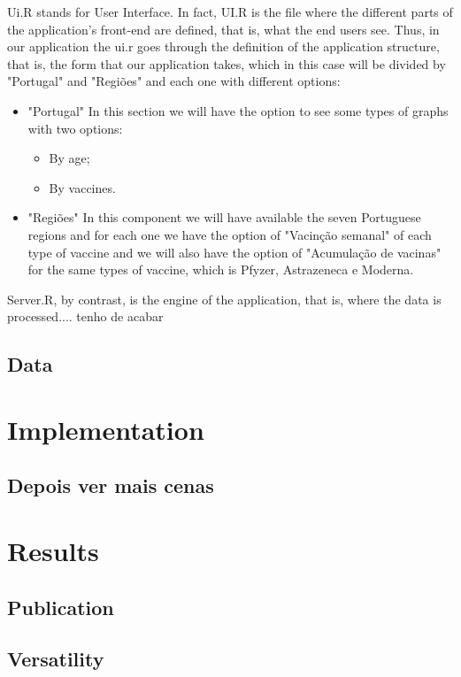 \documentclass[11pt,a4paper]{report}
\begin{document}
 Ui.R stands for User Interface. In fact, UI.R is the file where the different parts of the application's front-end are defined, that is, what the end users see. Thus, in our application the ui.r goes through the definition of the application structure, that is, the form that our application takes, which in this case will be divided by "Portugal" and "Regiões" and each one with different options: 
 \begin{itemize}
    \item "Portugal" 
    In this section we will have the option to see some types of graphs with two options: 
     \begin{itemize}
        \item By age; 
        \item By vaccines.

        
        \end{itemize}
    \item "Regiões"
     In this component we will have available the seven Portuguese regions and for each one we have the option of "Vacinção semanal" of each type of vaccine and we will also have the option of "Acumulação de vacinas" for the same types of vaccine, which is Pfyzer, Astrazeneca e Moderna.

    
\end{itemize}

Server.R, by contrast, is the engine of the application, that is, where the data is processed.... tenho de acabar 
 

 
\subsection{Data}
\section{Implementation}
\subsection{Depois ver mais cenas}
\section{Results}
\subsection{Publication}
\subsection{Versatility}
\end{document}
